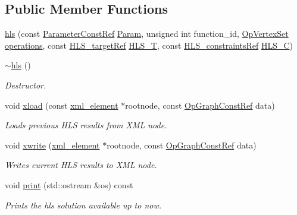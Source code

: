 \subsection*{Public Member Functions}
\begin{DoxyCompactItemize}
\item 
\hyperlink{classhls_a570eb6f6ceb989ed92923ccb318df05c}{hls} (const \hyperlink{Parameter_8hpp_a37841774a6fcb479b597fdf8955eb4ea}{Parameter\+Const\+Ref} \hyperlink{classhls_a97e43df586a38ff6051d75c21560ff48}{Param}, unsigned int function\+\_\+id, \hyperlink{classOpVertexSet}{Op\+Vertex\+Set} \hyperlink{classhls_a93d8454c7ca39afe832a6fd7cbabd227}{operations}, const \hyperlink{hls__target_8hpp_a390f1d55d3b31739665ff2776abe2a3f}{H\+L\+S\+\_\+target\+Ref} \hyperlink{classhls_af633e6a35e5a7d4074ca9b525955399b}{H\+L\+S\+\_\+T}, const \hyperlink{hls__constraints_8hpp_ac394d1c5cd991614133724294a79182b}{H\+L\+S\+\_\+constraints\+Ref} \hyperlink{classhls_a3d8e89506a2b39dc89ef71e2782a4c85}{H\+L\+S\+\_\+C})
\item 
\hyperlink{classhls_ae4186144f6fabfb957fbea22608d86fa}{$\sim$hls} ()
\begin{DoxyCompactList}\small\item\em Destructor. \end{DoxyCompactList}\item 
void \hyperlink{classhls_a49ad456bf4fd4865d39a688b90ffbff6}{xload} (const \hyperlink{classxml__element}{xml\+\_\+element} $\ast$rootnode, const \hyperlink{op__graph_8hpp_a9a0b240622c47584bee6951a6f5de746}{Op\+Graph\+Const\+Ref} data)
\begin{DoxyCompactList}\small\item\em Loads previous H\+LS results from X\+ML node. \end{DoxyCompactList}\item 
void \hyperlink{classhls_a49a13fe020ba1c669604ed1140612378}{xwrite} (\hyperlink{classxml__element}{xml\+\_\+element} $\ast$rootnode, const \hyperlink{op__graph_8hpp_a9a0b240622c47584bee6951a6f5de746}{Op\+Graph\+Const\+Ref} data)
\begin{DoxyCompactList}\small\item\em Writes current H\+LS results to X\+ML node. \end{DoxyCompactList}\item 
void \hyperlink{classhls_af4794ad983e93e87c6dca1e01ae61aa8}{print} (std\+::ostream \&os) const
\begin{DoxyCompactList}\small\item\em Prints the hls solution available up to now. \end{DoxyCompactList}\item 

\end{DoxyCompactItemize}
